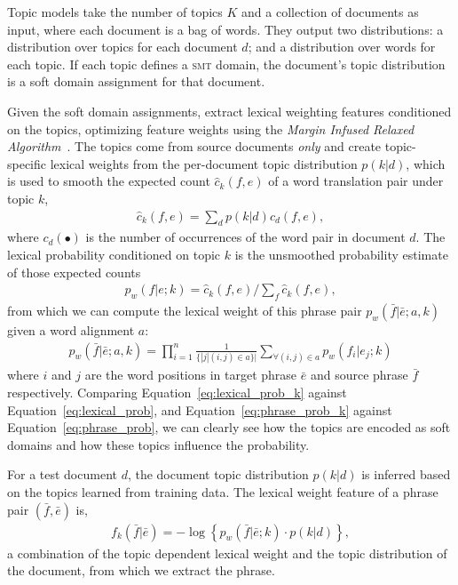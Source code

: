 Topic models take the number of topics $K$ and a collection of documents as input, where each document is a bag of words. They output two distributions: a distribution over topics for each document $d$; and a distribution over words for each topic. If each topic defines a \textsc{smt} domain, the document's topic distribution is a soft domain assignment for that document.

Given the soft domain assignments, \citet{Eidelman-12} extract lexical weighting features conditioned on the topics, optimizing feature weights using the \emph{Margin Infused Relaxed Algorithm}~\cite[\textsc{mira}]{Crammer:2006}.  The topics come from source documents \emph{only} and create topic-specific lexical weights from the per-document topic distribution $p(k|d)$, which is used to smooth the expected count $\hat{c}_{k}(f,e)$ of a word translation pair under topic $k$,
\begin{align}
\textstyle \hat{c}_{k}(f,e) = \sum_{d}{p(k|d)c_d(f,e)},
\end{align}
where $c_d(\bullet)$ is the number of occurrences of the word pair in document $d$.  The lexical probability conditioned on topic $k$ is the unsmoothed probability estimate of those expected counts
\begin{align}
\label{eq:lexical_prob_k}
\textstyle p_w(f|e;k) = \hat{c}_{k}(f,e) / \sum_f{\hat{c}_{k}(f,e)},
\end{align}
from which we can compute the lexical weight of this phrase pair
$p_w(\bar{f}|\bar{e};a, k)$ given a word alignment $a$\citep{koehn-03}:
\begin{align}
\label{eq:phrase_prob_k}
p_w(\bar{f} | \bar{e};a, k) = \prod^{n}_{i=1} \frac{1}{\{|j | (i, j) \in a\}|} \sum_{\forall (i,j) \in a} p_w(f_i | e_j; k)
\end{align}
where $i$ and $j$ are the word positions in target phrase $\bar{e}$ and source phrase $\bar{f}$ respectively. Comparing Equation~\ref{eq:lexical_prob_k} against Equation~\ref{eq:lexical_prob}, and Equation~\ref{eq:phrase_prob_k} against Equation~\ref{eq:phrase_prob}, we can clearly see how the topics are encoded as soft domains and how these topics influence the probability.

For a test document $d$, the document topic distribution $p(k | d)$ is inferred based on the topics learned from training data. The lexical weight feature of a phrase pair $(\bar{f}, \bar{e})$ is,
\begin{align}
\textstyle f_{k}(\bar{f}|\bar{e})=-\log\left\{{p_{w}(\bar{f}|\bar{e};k)\cdot p(k|d)}\right\},
\end{align}
a combination of the topic dependent lexical weight and the topic distribution of the document, from which we extract the phrase.

